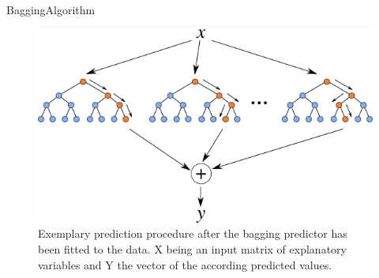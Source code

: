 \documentclass{beamer}
\begin{document}
\begin{frame}{Bagging}{Algorithm}
\begin{figure}
\includegraphics[scale=0.4]{external_figures/baggedtree.png}
\caption{Exemplary prediction procedure after the bagging predictor has been fitted to the data. X being an input matrix of explanatory variables and Y the vector of the according predicted values.}

\end{figure}

\end{frame}




\end{document}

